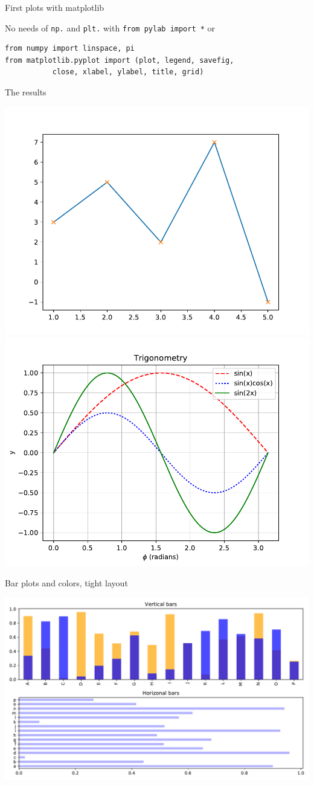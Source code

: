 \begin{frame}[fragile]
  {First plots with matplotlib}

\scriptsize


No needs of \verb+np.+ and \verb+plt.+ with \verb+from pylab import *+ or
\begin{Verbatim}
from numpy import linspace, pi
from matplotlib.pyplot import (plot, legend, savefig,
           close, xlabel, ylabel, title, grid)
\end{Verbatim}
\end{frame}

\begin{frame}
    {The results}

 \includegraphics[width=.48\textwidth]{codes/visualization/first.pdf}
 \includegraphics[width=.48\textwidth]{codes/visualization/trigonometry.pdf}
\end{frame}

\begin{frame}
  {Bar plots and colors, tight layout}

\scriptsize


  \includegraphics[width=.7\textwidth]{codes/visualization/bar_plots.pdf}
\end{frame}

